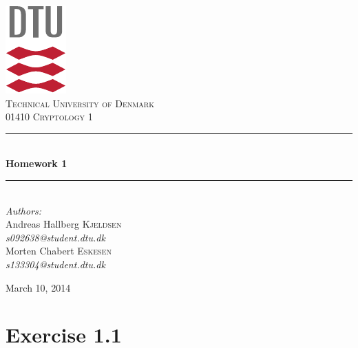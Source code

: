 \documentclass[11pt]{report}
\newcommand{\HRule}{\rule{\linewidth}{0.5mm}}
\begin{document}
\begin{titlepage}
\begin{center}

\includegraphics[scale=2.0]{../GFX/dtu_logo.pdf}\\[1cm]
\textsc{\LARGE Technical University of Denmark}\\[1.5cm]
\textsc{\Large 01410 Cryptology 1}\\[0.5cm]

\HRule \\[0.4cm]
{\huge \bfseries Homework 1}\\[0.1cm]
\HRule \\[1.5cm]

{\large
\emph{Authors:} \\[10pt]
Andreas Hallberg \textsc{Kjeldsen}\\
\emph{s092638@student.dtu.dk} \\[10pt]
Morten Chabert \textsc{Eskesen}\\
\emph{s133304@student.dtu.dk}
}
\vfill

{\large March 10, 2014}

\end{center}
\end{titlepage}

\section*{Exercise 1.1}
\end{document}

